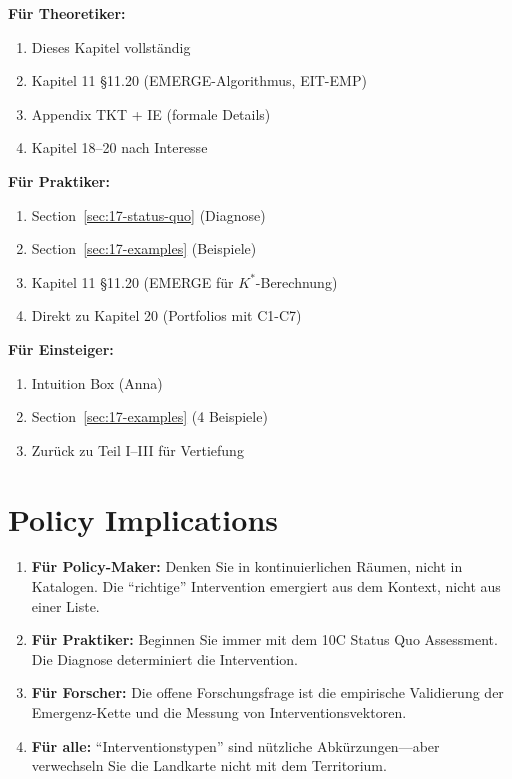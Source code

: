 \begin{tcolorbox}[colback=gray!5!white, colframe=gray!75!black,
    title=Empfohlene Lesepfade]

\textbf{F\"{u}r Theoretiker:}
\begin{enumerate}[nosep]
\item Dieses Kapitel vollst\"{a}ndig
\item Kapitel 11 §11.20 (EMERGE-Algorithmus, EIT-EMP)
\item Appendix TKT + IE (formale Details)
\item Kapitel 18--20 nach Interesse
\end{enumerate}

\textbf{F\"{u}r Praktiker:}
\begin{enumerate}[nosep]
\item Section~\ref{sec:17-status-quo} (Diagnose)
\item Section~\ref{sec:17-examples} (Beispiele)
\item Kapitel 11 §11.20 (EMERGE für $K^*$-Berechnung)
\item Direkt zu Kapitel 20 (Portfolios mit C1-C7)
\end{enumerate}

\textbf{F\"{u}r Einsteiger:}
\begin{enumerate}[nosep]
\item Intuition Box (Anna)
\item Section~\ref{sec:17-examples} (4 Beispiele)
\item Zur\"{u}ck zu Teil I--III f\"{u}r Vertiefung
\end{enumerate}

\end{tcolorbox}



\section*{Policy Implications}

\begin{enumerate}
\item \textbf{F\"{u}r Policy-Maker:} Denken Sie in kontinuierlichen R\"{a}umen, nicht in Katalogen. Die ``richtige'' Intervention emergiert aus dem Kontext, nicht aus einer Liste.

\item \textbf{F\"{u}r Praktiker:} Beginnen Sie immer mit dem 10C Status Quo Assessment. Die Diagnose determiniert die Intervention.

\item \textbf{F\"{u}r Forscher:} Die offene Forschungsfrage ist die empirische Validierung der Emergenz-Kette und die Messung von Interventionsvektoren.

\item \textbf{F\"{u}r alle:} ``Interventionstypen'' sind n\"{u}tzliche Abk\"{u}rzungen---aber verwechseln Sie die Landkarte nicht mit dem Territorium.
\end{enumerate}


